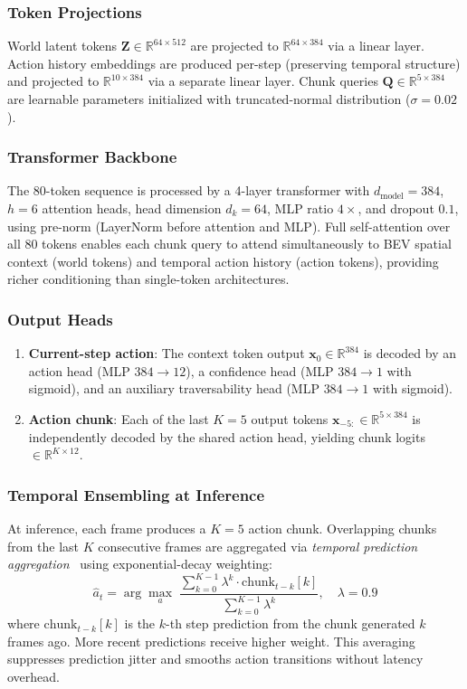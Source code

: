 \documentclass[sensors,article,submit,pdftex,moreauthors]{Definitions/mdpi}
\begin{document}
\subsubsection{Token Projections}
World latent tokens $\mathbf{Z} \in \mathbb{R}^{64 \times 512}$ are projected to $\mathbb{R}^{64 \times 384}$ via a linear layer. Action history embeddings are produced per-step (preserving temporal structure) and projected to $\mathbb{R}^{10 \times 384}$ via a separate linear layer. Chunk queries $\mathbf{Q} \in \mathbb{R}^{5 \times 384}$ are learnable parameters initialized with truncated-normal distribution ($\sigma{=}0.02$).

\subsubsection{Transformer Backbone}
The 80-token sequence is processed by a 4-layer transformer with $d_\text{model}{=}384$, $h{=}6$ attention heads, head dimension $d_k{=}64$, MLP ratio $4\times$, and dropout $0.1$, using pre-norm (LayerNorm before attention and MLP). Full self-attention over all 80 tokens enables each chunk query to attend simultaneously to BEV spatial context (world tokens) and temporal action history (action tokens), providing richer conditioning than single-token architectures.

\subsubsection{Output Heads}
\begin{enumerate}
    \item \textbf{Current-step action}: The context token output $\mathbf{x}_0 \in \mathbb{R}^{384}$ is decoded by an action head (MLP $384{\to}12$), a confidence head (MLP $384{\to}1$ with sigmoid), and an auxiliary traversability head (MLP $384{\to}1$ with sigmoid).
    \item \textbf{Action chunk}: Each of the last $K{=}5$ output tokens $\mathbf{x}_{-5:} \in \mathbb{R}^{5 \times 384}$ is independently decoded by the shared action head, yielding chunk logits $\in \mathbb{R}^{K \times 12}$.
\end{enumerate}

\subsubsection{Temporal Ensembling at Inference}
At inference, each frame produces a $K{=}5$ action chunk. Overlapping chunks from the last $K$ consecutive frames are aggregated via \emph{temporal prediction aggregation}~\cite{zhao2023act} using exponential-decay weighting:
\begin{equation}
    \hat{a}_t = \arg\max_a \;\frac{\displaystyle\sum_{k=0}^{K-1} \lambda^k \cdot \text{chunk}_{t-k}[k]}
                                  {\displaystyle\sum_{k=0}^{K-1} \lambda^k},
    \quad \lambda = 0.9
\end{equation}
where $\text{chunk}_{t-k}[k]$ is the $k$-th step prediction from the chunk generated $k$ frames ago. More recent predictions receive higher weight. This averaging suppresses prediction jitter and smooths action transitions without latency overhead.
\end{document}

